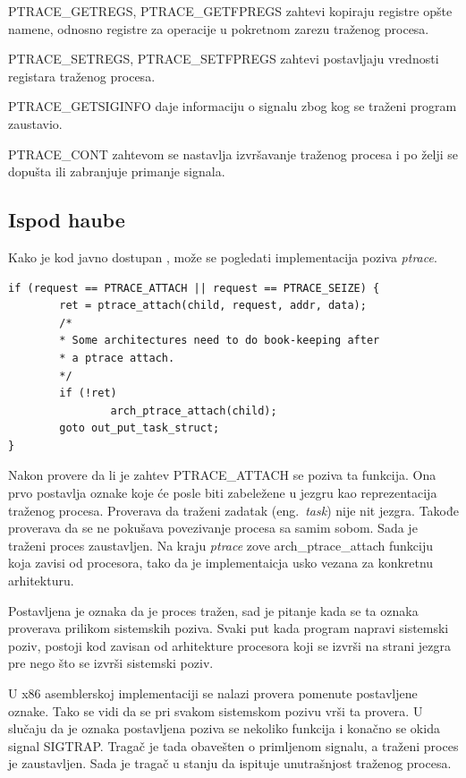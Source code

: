 \documentclass[a4paper]{article}
\begin{document}
PTRACE\_GETREGS, PTRACE\_GETFPREGS
    zahtevi kopiraju registre opšte namene, odnosno registre za operacije u pokretnom zarezu 
    traženog procesa.

PTRACE\_SETREGS, PTRACE\_SETFPREGS
    zahtevi postavljaju vrednosti registara traženog procesa.

PTRACE\_GETSIGINFO 
    daje informaciju o signalu zbog kog se traženi program zaustavio.

PTRACE\_CONT
    zahtevom se nastavlja izvršavanje traženog procesa i po želji se 
    dopušta ili zabranjuje primanje signala.
\subsection{Ispod haube}	

Kako je kod javno dostupan \cite{code}, može se pogledati implementacija poziva \emph{ptrace}.
\begin{verbatim}
if (request == PTRACE_ATTACH || request == PTRACE_SEIZE) {
        ret = ptrace_attach(child, request, addr, data);
        /*
        * Some architectures need to do book-keeping after
        * a ptrace attach.
        */
        if (!ret)
                arch_ptrace_attach(child);
        goto out_put_task_struct;
}
\end{verbatim}

Nakon provere da li je zahtev PTRACE\_ATTACH se poziva ta funkcija.
Ona prvo postavlja oznake koje će posle biti zabeležene u jezgru kao reprezentacija 
traženog procesa. Proverava da traženi zadatak (eng.~{\em task}) nije nit jezgra. 
Takođe proverava da se ne pokušava povezivanje procesa sa samim sobom.
Sada je traženi proces zaustavljen. Na kraju \emph{ptrace} zove arch\_ptrace\_attach funkciju koja zavisi
od procesora, tako da je implementaicja usko vezana za konkretnu arhitekturu.

Postavljena je oznaka da je proces tražen, sad je pitanje kada se ta oznaka proverava prilikom 
sistemskih poziva. Svaki put kada program napravi sistemski poziv, postoji kod zavisan od arhitekture
procesora koji se izvrši na strani jezgra pre nego što se izvrši sistemski poziv.

U x86 asemblerskoj implementaciji se nalazi provera pomenute postavljene oznake\cite{blog}.
Tako se vidi da se pri svakom sistemskom pozivu vrši ta provera. 
U slučaju da je oznaka postavljena poziva se nekoliko funkcija i konačno se okida signal SIGTRAP.
Tragač je tada obavešten o primljenom signalu, a traženi proces je zaustavljen. 
Sada je tragač u stanju da ispituje unutrašnjost traženog procesa.
\end{document}
